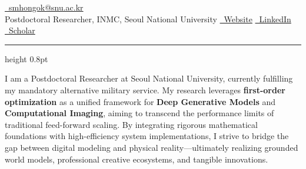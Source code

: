 \documentclass[a4paper,11pt]{article}
\begin{document}


\noindent
{} \hfill \href{mailto:smhongok@snu.ac.kr}{\faEnvelope \ smhongok@snu.ac.kr} \\
{\large Postdoctoral Researcher, INMC, Seoul National University} \hfill \href{https://smhongok.github.io}{\faGlobe \ Website} \quad \href{https://linkedin.com/in/sm-hong}{\faLinkedin \ LinkedIn} \quad \href{https://scholar.google.com/citations?user=YOUR_ID}{\faGraduationCap \ Scholar}

\vspace{0.5ex}
\hrule height 0.8pt
\vspace{1ex}

\noindent
I am a Postdoctoral Researcher at Seoul National University, currently fulfilling my mandatory alternative military service. My research leverages \textbf{first-order optimization} as a unified framework for \textbf{Deep Generative Models} and \textbf{Computational Imaging}, aiming to transcend the performance limits of traditional feed-forward scaling. By integrating rigorous mathematical foundations with high-efficiency system implementations, I strive to bridge the gap between digital modeling and physical reality—ultimately realizing grounded world models, professional creative ecosystems, and tangible innovations.

\vspace{2pt}
\end{document}
